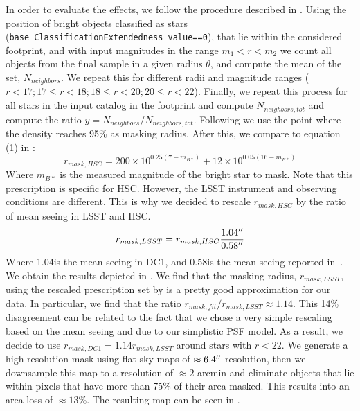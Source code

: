 \documentclass[twocolumn]{aastex62}
\begin{document}
In order to evaluate the effects, we follow the procedure described in \citet{2018PASJ...70S...7C}. Using the position of bright objects classified as stars (\texttt{base\_ClassificationExtendedness\_value==0}), that lie within the considered footprint, and with input magnitudes in the range $m_{1} < r < m_{2}$ we count all objects from the final sample in a given radius $\theta$, and compute the mean of the set, $N_{neighbors}$. We repeat this for different radii and magnitude ranges ($ r < 17; 17 \leq r < 18; 18 \leq r < 20; 20 \leq r < 22$). Finally, we repeat this process for all stars in the input catalog in the footprint and compute $N_{neighbors, tot}$ and compute the ratio $y = N_{neighbors}/N_{neighbors, tot}$. Following \citet{2018PASJ...70S...7C} we use the point where the density reaches 95\% as masking radius. After this, we compare to equation (1) in \citet{2018PASJ...70S..25M}:
\begin{equation}
r_{mask,HSC} = 200\times 10^{0.25(7-m_{B*})} + 12 \times 10^{0.05(16-m_{B*})} 
\end{equation}
Where $m_{B*}$ is the measured magnitude of the bright star to mask. Note that this prescription is specific for HSC. However, the LSST instrument and observing conditions are different. This is why we decided to rescale $r_{mask,HSC}$ by the ratio of mean seeing in LSST and HSC.
\begin{equation}
r_{mask,LSST} = r_{mask,HSC} \frac{1.04\arcsec}{0.58\arcsec}
\end{equation}
Where 1.04\arcsec is the mean seeing in DC1, and 0.58\arcsec is the mean seeing reported in~\citet{2018PASJ...70S..25M}. We obtain the results depicted in . We find that the masking radius, $r_{mask,LSST}$, using the rescaled prescription set by \citet{2018PASJ...70S..25M} is a pretty good approximation for our data. In particular, we find that the ratio $r_{mask,fit}/r_{mask,LSST} \approx 1.14$. This 14\% disagreement can be related to the fact that we chose a very simple rescaling based on the mean seeing and due to our simplistic PSF model. As a result, we decide to use $r_{mask, DC1} = 1.14 r_{mask, LSST}$ around stars with $r < 22$. We generate a high-resolution mask using flat-sky maps of $\approx 6.4 \mbox{$^{\prime\prime}$}$ resolution, then we downsample this map to a resolution of $\approx 2$ arcmin and eliminate objects that lie within pixels that have more than 75\% of their area masked. This results into an area loss of $\approx 13\%$. The resulting map can be seen in . 
\end{document}
